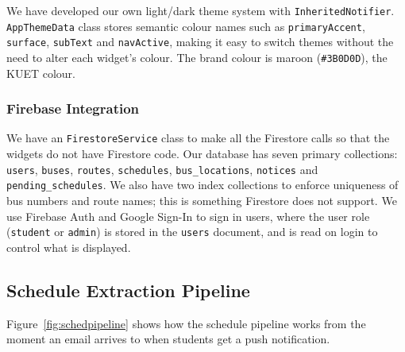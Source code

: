 \documentclass[12pt,a4paper]{report}
\begin{document}
We have developed our own light/dark theme system with \texttt{InheritedNotifier}. \texttt{AppThemeData} class stores semantic colour names such as \texttt{primaryAccent}, \texttt{surface}, \texttt{subText} and \texttt{navActive}, making it easy to switch themes without the need to alter each widget's colour. The brand colour is maroon (\texttt{\#3B0D0D}), the KUET colour.

\subsubsection{Firebase Integration}

We have an \texttt{FirestoreService} class to make all the Firestore calls so that the widgets do not have Firestore code. Our database has seven primary collections: \texttt{users}, \texttt{buses}, \texttt{routes}, \texttt{schedules}, \texttt{bus\_locations}, \texttt{notices} and \texttt{pending\_schedules}. We also have two index collections to enforce uniqueness of bus numbers and route names; this is something Firestore does not support. We use Firebase Auth and Google Sign-In to sign in users, where the user role (\texttt{student} or \texttt{admin}) is stored in the \texttt{users} document, and is read on login to control what is displayed.

\subsection{Schedule Extraction Pipeline}

Figure~\ref{fig:schedpipeline} shows how the schedule pipeline works from the moment an email arrives to when students get a push notification.
\end{document}
